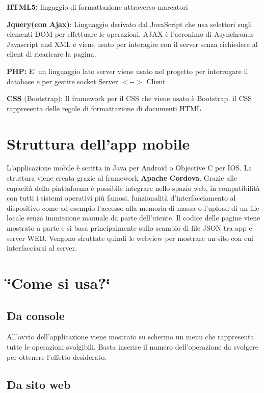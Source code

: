\begin{DoxyItemize}
\item {\bfseries \-H\-T\-M\-L5\-:} lingaggio di formattazione attraverso marcatori
\item {\bfseries \-Jquery(con Ajax)}\-: \-Linguaggio derivato dal \-Java\-Script che usa selettori sugli elementi \-D\-O\-M per effettuare le operazioni. \-A\-J\-A\-X è l'acronimo di \-Asynchronus \-Javascript and \-X\-M\-L e viene usato per interagire con il server senza richiedere al client di ricaricare la pagina.
\item {\bfseries \-P\-H\-P\-:} \-E' un linguaggio lato server viene usato nel progetto per interrogare il database e per gestire socket \hyperlink{classServer}{\-Server} $<$-\/-\/$>$ \-Client
\item {\bfseries \-C\-S\-S} (\-Bootstrap)\-: \-Il framework per il \-C\-S\-S che viene usato è \-Bootstrap. il \-C\-S\-S rappresenta delle regole di formattazione di documenti \-H\-T\-M\-L. 
\end{DoxyItemize}\hypertarget{index_appMobileStruct}{}\section{\-Struttura dell'app mobile}\label{index_appMobileStruct}
\-L'applicazione mobile è scritta in \-Java per \-Android o \-Objective \-C per \-I\-O\-S. \-La struttura viene creata grazie al framework {\bfseries \-Apache} {\bfseries \-Cordova}. \-Grazie alle capacità della piattaforma è possibile integrare nello spazio web, in compatibilità con tutti i sistemi operativi più famosi, funzionalità d'interfacciamento al dispositivo come ad esempio l'accesso alla memoria di massa o l'upload di un file locale senza immissione manuale da parte dell'utente. \-Il codice delle pagine viene mostrato a parte e si basa principalmente sullo scambio di file \-J\-S\-O\-N tra app e server \-W\-E\-B. \-Vengono sfruttate quindi le webview per mostrare un sito con cui interfacciarsi al server. \hypertarget{index_usage_sec}{}\section{\char`\"{}\-Come si usa?\char`\"{}}\label{index_usage_sec}
\hypertarget{index_fromConsole}{}\subsection{\-Da console}\label{index_fromConsole}
\-All'avvio dell'applicazione viene mostrato su schermo un menu che rappresenta tutte le operazioni svolgibili. \-Basta inserire il numero dell'operazione da svolgere per ottenere l'effetto desiderato. \hypertarget{index_fromWeb}{}\subsection{\-Da sito web}\label{index_fromWeb}
